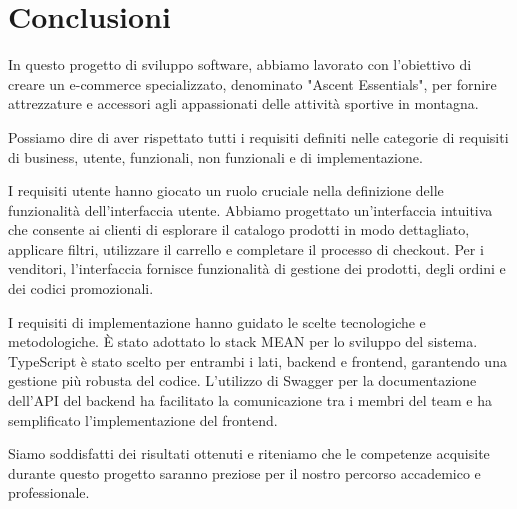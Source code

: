 \chapter{Conclusioni}
In questo progetto di sviluppo software, abbiamo lavorato con l'obiettivo di creare un e-commerce specializzato, denominato "Ascent Essentials", per fornire attrezzature e accessori agli appassionati delle attività sportive in montagna.

Possiamo dire di aver rispettato tutti i requisiti definiti nelle categorie di requisiti di business, utente, funzionali, non funzionali e di implementazione.

I requisiti utente hanno giocato un ruolo cruciale nella definizione delle funzionalità dell'interfaccia utente. Abbiamo progettato un'interfaccia intuitiva che consente ai clienti di esplorare il catalogo prodotti in modo dettagliato, applicare filtri, utilizzare il carrello e completare il processo di checkout. Per i venditori, l'interfaccia fornisce funzionalità di gestione dei prodotti, degli ordini e dei codici promozionali.

I requisiti di implementazione hanno guidato le scelte tecnologiche e metodologiche. È stato adottato lo stack MEAN per lo sviluppo del sistema. TypeScript è stato scelto per entrambi i lati, backend e frontend, garantendo una gestione più robusta del codice. L'utilizzo di Swagger per la documentazione dell'API del backend ha facilitato la comunicazione tra i membri del team e ha semplificato l'implementazione del frontend.

Siamo soddisfatti dei risultati ottenuti e riteniamo che le competenze acquisite durante questo progetto saranno preziose per il nostro percorso accademico e professionale.